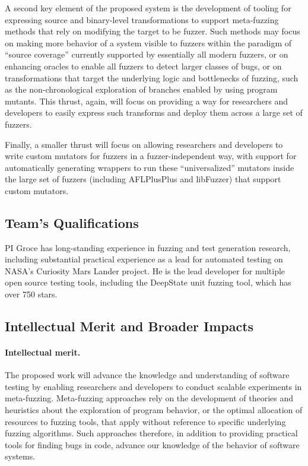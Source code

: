 \documentclass[numbers]{proposalnsf}
\begin{document}
A second key element of the proposed system is the development of tooling for expressing source and binary-level transformations to support meta-fuzzing methods that rely on modifying the target to be fuzzer.  Such methods may focus on making more behavior of a system visible to fuzzers within the paradigm of ``source coverage'' currently supported by essentially all modern fuzzers, or on enhancing oracles to enable all fuzzers to detect larger classes of bugs, or on transformations that target the underlying logic and bottlenecks of fuzzing, such as the non-chronological exploration of branches enabled by using program mutants.  This thrust, again, will focus on providing a way for researchers and developers to easily express such transforms and deploy them across a large set of fuzzers.

Finally, a smaller thrust will focus on allowing researchers and developers to write custom mutators for fuzzers in a fuzzer-independent way, with support for automatically generating wrappers to run these ``universalized'' mutators inside the large set of fuzzers (including AFLPlusPlus and libFuzzer) that support custom mutators.


\subsection{Team's Qualifications}

PI Groce has long-standing experience in fuzzing and test generation research, including substantial practical experience as a lead for automated testing on NASA's Curiosity Mars Lander project.  He is the lead developer for multiple open source testing tools, including the DeepState unit fuzzing tool, which has over 750 stars.  

\subsection{Intellectual Merit and Broader Impacts}

\paragraph{Intellectual merit.} The proposed work will advance the
knowledge and understanding of software testing by enabling
researchers and developers to conduct scalable experiments in meta-fuzzing.  Meta-fuzzing approaches rely on the development of theories and heuristics about the exploration of program behavior, or the optimal allocation of resources to fuzzing tools, that apply without reference to specific underlying fuzzing algorithms.  Such approaches therefore, in addition to providing practical tools for finding bugs in code, advance our knowledge of the behavior of software systems.
\end{document}
